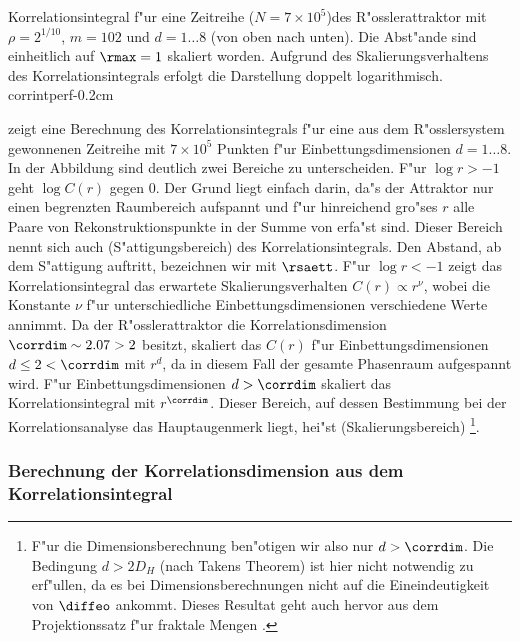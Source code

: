 {Korrelationsintegral f"ur eine Zeitreihe ($N=7\times 10^5$)des R"osslerattraktor mit $\rho=2^{1/10}$,
$m=102$ und $d=1\dots 8$ (von oben nach unten). Die Abst"ande sind einheitlich auf
$\rmax=1$ skaliert worden. Aufgrund des Skalierungsverhaltens des
Korrelationsintegrals erfolgt die Darstellung doppelt logarithmisch.} 
{corrintperf}{-0.2cm}

 zeigt eine Berechnung des Korrelationsintegrals f"ur eine aus dem
R"osslersystem \cite{Roessler76} gewonnenen Zeitreihe mit $7\times 10^5$ Punkten 
f"ur Einbettungsdimensionen $d=1\dots 8$. In der Abbildung sind deutlich zwei Bereiche zu
unterscheiden. F"ur $\log r>-1$ geht $\log C(r)$ gegen 0. Der Grund liegt einfach
darin, da"s der Attraktor nur einen begrenzten Raumbereich aufspannt und f"ur hinreichend
gro"ses $r$ alle Paare von Rekonstruktionspunkte  in der Summe von 
erfa"st sind. Dieser Bereich nennt sich auch \begriff(S"attigungsbereich) des
Korrelationsintegrals. Den Abstand, ab dem S"attigung auftritt, bezeichnen wir mit
$\rsaett$. F"ur $\log r<-1$ zeigt das Korrelationsintegral das 
 erwartete Skalierungsverhalten $C(r)\propto r^\nu$, wobei die Konstante
$\nu$ f"ur unterschiedliche Einbettungsdimensionen verschiedene Werte annimmt. Da der
R"osslerattraktor die Korrelationsdimension $\corrdim\sim 2.07>2$ besitzt, skaliert das $C(r)$
f"ur Einbettungsdimensionen $d\leq 2<\corrdim$ mit $r^d$, da in diesem Fall der gesamte Phasenraum
aufgespannt wird. F"ur Einbettungsdimensionen $d>\corrdim$ skaliert das Korrelationsintegral
mit $r^{\corrdim}$. Dieser Bereich, auf dessen Bestimmung bei der Korrelationsanalyse das
Hauptaugenmerk liegt, hei"st \begriff(Skalierungsbereich)
\footnote{F"ur die Dimensionsberechnung ben"otigen wir also nur $d>\corrdim$. Die Bedingung
$d>2D_H$ (nach Takens Theorem) ist hier nicht notwendig zu erf"ullen, da es bei
Dimensionsberechnungen nicht auf die Eineindeutigkeit von $\diffeo$ ankommt. Dieses Resultat geht
auch hervor aus dem Projektionssatz f"ur fraktale Mengen \cite{Falconer93}.}.

\subsubsection{Berechnung der Korrelationsdimension aus dem Korrelationsintegral}
